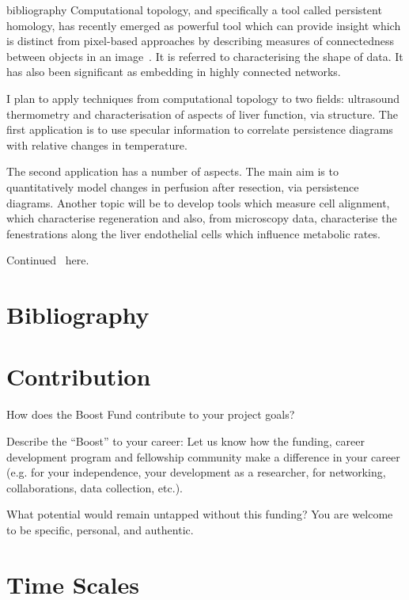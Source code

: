 \begin{btUnit}
\begin{btSect}{bibliography}
Computational topology, and specifically a tool called persistent homology, has recently emerged as powerful tool which can provide insight which is distinct from pixel-based approaches by describing measures of connectedness between objects in an image~. It is referred to characterising the shape of data.  It has also been significant as embedding in highly connected networks. 

I plan to apply techniques from computational topology to two fields: \textcolor{custom}{ultrasound thermometry} and \textcolor{custom}{characterisation of aspects of liver function}, via structure. The first application is to use specular information to correlate persistence diagrams with relative changes in temperature. 

The second application has a number of aspects. The main aim is to quantitatively model changes in perfusion after resection, via persistence diagrams. Another topic will be to develop tools which measure cell alignment, which characterise regeneration and also, from microscopy data, characterise the fenestrations along the liver endothelial cells which influence metabolic rates.

\newpage
Continued~\cite{ravishankar2023sonosamtrack} here.

\newpage
\section{Bibliography}

\btPrintCited 

\end{btSect} 
\end{btUnit} 



\newpage
\section{Contribution}

How does the Boost Fund contribute to your project goals?  

Describe the \enquote{Boost} to your career: Let us know how the funding, career development program and fellowship community make a difference in your career (e.g. for your independence, your development as a researcher, for networking, collaborations, data collection, etc.).  

What potential would remain untapped without this funding? You are welcome to be specific, personal, and authentic. 


\newpage
\section{Time Scales}





